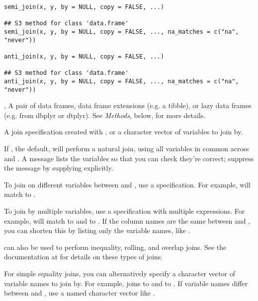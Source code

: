 \documentclass[a4paper]{book}
\begin{document}
%
\begin{Usage}
\begin{verbatim}
semi_join(x, y, by = NULL, copy = FALSE, ...)

## S3 method for class 'data.frame'
semi_join(x, y, by = NULL, copy = FALSE, ..., na_matches = c("na", "never"))

anti_join(x, y, by = NULL, copy = FALSE, ...)

## S3 method for class 'data.frame'
anti_join(x, y, by = NULL, copy = FALSE, ..., na_matches = c("na", "never"))
\end{verbatim}
\end{Usage}
%
\begin{Arguments}
\begin{ldescription}
\item[\code{x}, \code{y}] A pair of data frames, data frame extensions (e.g. a tibble), or
lazy data frames (e.g. from dbplyr or dtplyr). See \emph{Methods}, below, for
more details.

\item[\code{by}] A join specification created with , or a character
vector of variables to join by.

If , the default,  will perform a natural join, using all
variables in common across  and . A message lists the variables so
that you can check they're correct; suppress the message by supplying 
explicitly.

To join on different variables between  and , use a 
specification. For example,  will match  to .

To join by multiple variables, use a  specification with
multiple expressions. For example,  will match
 to  and  to . If the column names are the same between
 and , you can shorten this by listing only the variable names, like
.

 can also be used to perform inequality, rolling, and overlap
joins. See the documentation at  for details on
these types of joins.

For simple equality joins, you can alternatively specify a character vector
of variable names to join by. For example,  joins 
to  and  to . If variable names differ between  and ,
use a named character vector like .


\end{ldescription}
\end{Arguments}
\end{document}

